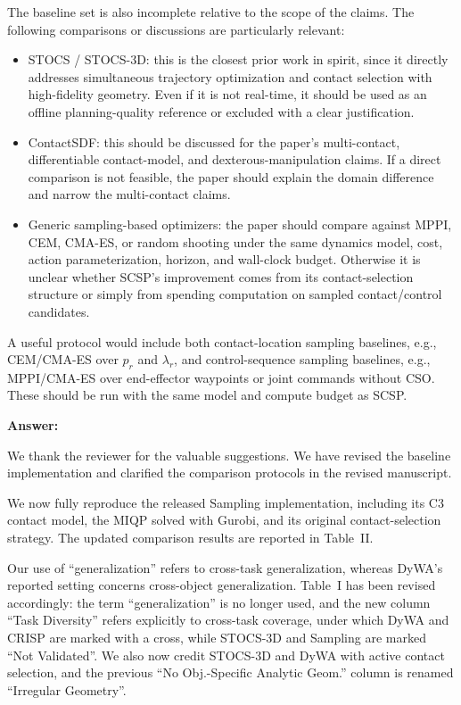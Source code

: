 \documentclass[journal,10pt]{IEEEtran}
\newcommand{\answer}{\par\smallskip\noindent\color{black}\textbf{Answer: }\ignorespaces
}
\begin{document}
The baseline set is also incomplete relative to the scope of the claims. The following comparisons or discussions are particularly relevant:
\begin{itemize}
 \item STOCS / STOCS-3D: this is the closest prior work in spirit, since it directly addresses simultaneous trajectory optimization and contact selection with high-fidelity geometry. Even if it is not real-time, it should be used as an offline planning-quality reference or excluded with a clear justification.
 \item ContactSDF: this should be discussed for the paper's multi-contact, differentiable contact-model, and dexterous-manipulation claims. If a direct comparison is not feasible, the paper should explain the domain difference and narrow the multi-contact claims.
 \item Generic sampling-based optimizers: the paper should compare against MPPI, CEM, CMA-ES, or random shooting under the same dynamics model, cost, action parameterization, horizon, and wall-clock budget. Otherwise it is unclear whether SCSP's improvement comes from its contact-selection structure or simply from spending computation on sampled contact/control candidates.
\end{itemize}
A useful protocol would include both contact-location sampling baselines, e.g., CEM/CMA-ES over $p_r$ and $\lambda_r$, and control-sequence sampling baselines, e.g., MPPI/CMA-ES over end-effector waypoints or joint commands without CSO. These should be run with the same model and compute budget as SCSP.



\answer
We thank the reviewer for the valuable suggestions. We have revised the baseline implementation and clarified the comparison protocols in the revised manuscript.

We now fully reproduce the released Sampling implementation, including its C3 contact model, the MIQP solved with Gurobi, and its original contact-selection strategy. The updated comparison results are reported in Table~II.

Our use of ``generalization'' refers to cross-task generalization, whereas DyWA's reported setting concerns cross-object generalization. Table~I has been revised accordingly: the term ``generalization'' is no longer used, and the new column ``Task Diversity'' refers explicitly to cross-task coverage, under which DyWA and CRISP are marked with a cross, while STOCS-3D and Sampling are marked ``Not Validated''. We also now credit STOCS-3D and DyWA with active contact selection, and the previous ``No Obj.-Specific Analytic Geom.'' column is renamed ``Irregular Geometry''.
\end{document}
